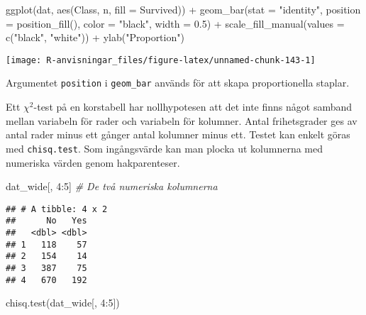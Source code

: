 \documentclass[
]{book}
\newenvironment{Shaded}{\begin{snugshade}}{\end{snugshade}}
\newcommand{\AttributeTok}[1]{\textcolor[rgb]{0.77,0.63,0.00}{#1}}
\newcommand{\CommentTok}[1]{\textcolor[rgb]{0.56,0.35,0.01}{\textit{#1}}}
\newcommand{\DecValTok}[1]{\textcolor[rgb]{0.00,0.00,0.81}{#1}}
\newcommand{\FloatTok}[1]{\textcolor[rgb]{0.00,0.00,0.81}{#1}}
\newcommand{\FunctionTok}[1]{\textcolor[rgb]{0.00,0.00,0.00}{#1}}
\newcommand{\NormalTok}[1]{#1}
\newcommand{\SpecialCharTok}[1]{\textcolor[rgb]{0.00,0.00,0.00}{#1}}
\newcommand{\StringTok}[1]{\textcolor[rgb]{0.31,0.60,0.02}{#1}}
\theoremstyle{definition}
\theoremstyle{definition}
\theoremstyle{definition}
\theoremstyle{definition}
\theoremstyle{remark}
\begin{document}
\begin{Shaded}
\begin{Highlighting}[]
\FunctionTok{ggplot}\NormalTok{(dat, }\FunctionTok{aes}\NormalTok{(Class, n, }\AttributeTok{fill =}\NormalTok{ Survived)) }\SpecialCharTok{+}
  \FunctionTok{geom\_bar}\NormalTok{(}\AttributeTok{stat =} \StringTok{"identity"}\NormalTok{, }\AttributeTok{position =} \FunctionTok{position\_fill}\NormalTok{(), }
           \AttributeTok{color =} \StringTok{"black"}\NormalTok{, }\AttributeTok{width =} \FloatTok{0.5}\NormalTok{) }\SpecialCharTok{+}
  \FunctionTok{scale\_fill\_manual}\NormalTok{(}\AttributeTok{values =} \FunctionTok{c}\NormalTok{(}\StringTok{"black"}\NormalTok{, }\StringTok{"white"}\NormalTok{)) }\SpecialCharTok{+}
  \FunctionTok{ylab}\NormalTok{(}\StringTok{"Proportion"}\NormalTok{)}
\end{Highlighting}
\end{Shaded}

\begin{center}\texttt{[image: R-anvisningar\_files/figure-latex/unnamed-chunk-143-1]} \end{center}

Argumentet \texttt{position} i \texttt{geom\_bar} används för att skapa proportionella staplar.

Ett \(\chi^2\)-test på en korstabell har nollhypotesen att det inte finns något samband mellan variabeln för rader och variabeln för kolumner. Antal frihetsgrader ges av antal rader minus ett gånger antal kolumner minus ett. Testet kan enkelt göras med \texttt{chisq.test}. Som ingångsvärde kan man plocka ut kolumnerna med numeriska värden genom hakparenteser.

\begin{Shaded}
\begin{Highlighting}[]
\NormalTok{dat\_wide[, }\DecValTok{4}\SpecialCharTok{:}\DecValTok{5}\NormalTok{] }\CommentTok{\# De två numeriska kolumnerna}
\end{Highlighting}
\end{Shaded}

\begin{verbatim}
## # A tibble: 4 x 2
##      No   Yes
##   <dbl> <dbl>
## 1   118    57
## 2   154    14
## 3   387    75
## 4   670   192
\end{verbatim}

\begin{Shaded}
\begin{Highlighting}[]
\FunctionTok{chisq.test}\NormalTok{(dat\_wide[, }\DecValTok{4}\SpecialCharTok{:}\DecValTok{5}\NormalTok{])}
\end{Highlighting}
\end{Shaded}
\end{document}
